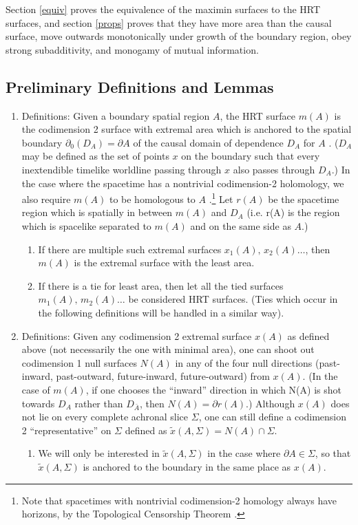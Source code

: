\documentclass[12pt]{article}
\begin{document}
Section \ref{equiv} proves the equivalence of the maximin surfaces to the HRT surfaces, and section \ref{props} proves that they have more area than the causal surface, move outwards monotonically under growth of the boundary region, obey strong subadditivity, and monogamy of mutual information.

\subsection{Preliminary Definitions and Lemmas}\label{pre}

\begin{enumerate}

\item \label{1} Definitions: Given a boundary spatial region $A$, the HRT surface $m(A)$ is the codimension 2 surface with extremal area which is anchored to the spatial boundary $\partial_0(D_A) = \partial A$ of the causal domain of dependence $D_A$ for $A$ \cite{HRT07}.  ($D_A$ may be defined as the set of points $x$ on the boundary such that every inextendible timelike worldline passing through $x$ also passes through $D_A$.)  In the case where the spacetime has a nontrivial codimension-2 holomology, we also require $m(A)$ to be homologous to $A$ \cite{HT07,fursaev06}.\footnote{Note that spacetimes with nontrivial codimension-2 homology always have horizons, by the Topological Censorship Theorem \cite{top}.}  Let $r(A)$ be the spacetime region which is spatially in between $m(A)$ and $D_A$ (i.e. r(A) is the region which is spacelike separated to $m(A)$ and on the same side as $A$.)
	\begin{enumerate}
	\item If there are multiple such extremal surfaces $x_1(A),\,x_2(A) \ldots$, then $m(A)$ is the extremal surface with the least area.
	\item If there is a tie for least area, then let all the tied surfaces $m_1(A),\,m_2(A) \ldots$ be considered HRT surfaces.  (Ties which occur in the following definitions will be handled in a similar way).
	\end{enumerate}
\item Definitions: Given any codimension 2 extremal surface $x(A)$ as defined above (not necessarily the one with minimal area), one can shoot out codimension 1 null surfaces $N(A)$ in any of the four null directions (past-inward, past-outward, future-inward, future-outward) from $x(A)$.  (In the case of $m(A)$, if one chooses the ``inward'' direction in which N(A) is shot towards $D_A$ rather than $D_{\bar{A}}$, then $N(A) = \partial r(A)$.)  Although $x(A)$ does not lie on every complete achronal slice $\Sigma$, one can still define a codimension 2 ``representative'' on $\Sigma$ defined as $\tilde{x}(A,\Sigma) = N(A) \cap \Sigma$.
	\begin{enumerate}
	\item We will only be interested in $\tilde{x}(A,\Sigma)$ in the case where $\partial A \in \Sigma$, so that $\tilde{x}(A,\Sigma)$ is anchored to the boundary in the same place as $x(A)$.  	
	\end{enumerate}


\end{enumerate}
\end{document}
